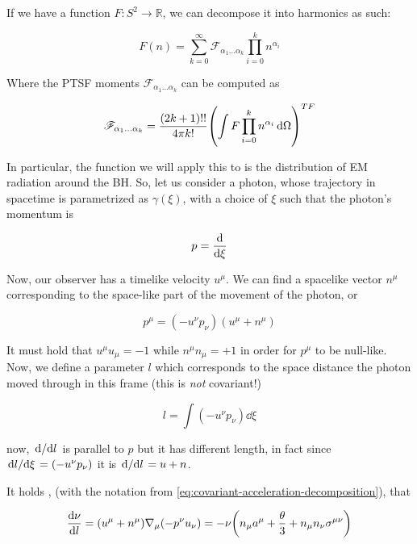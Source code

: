 \documentclass[main.tex]{subfiles}
\begin{document}
If we have a function \(F\colon S^2 \rightarrow \mathbb R\), we can decompose it into harmonics as such:

\begin{equation}
    F(n) = \sum _{k=0}   ^{\infty}
    \mathscr F_{\alpha_1 \dots \alpha_k} \prod_{i=0}^k n^{\alpha_i}
\end{equation}

Where the PTSF moments \(\mathscr F_{\alpha_1 \dots \alpha_k}\) can be computed as

\begin{equation} \label{eq:PSTF-moments-function-decomposition}
    \mathscr F_{\alpha_1 \dots \alpha_k} =
    \frac{(2k+1)!!}{4 \pi k!} \qty(\int F \prod_{i=0}^k n^{\alpha_i}  \dd{\Omega}  )^{TF}
\end{equation}

In particular, the function we will apply this to is the distribution of EM radiation around the BH. So, let us consider a photon, whose trajectory in spacetime is parametrized as \(\gamma(\xi)\), with a choice of \(\xi\) such that the photon's momentum is

\begin{equation}
    p = \dv{}{\xi}
\end{equation}

Now, our observer has a timelike velocity \(u^\mu\). We can find a spacelike vector \(n^\mu\) corresponding to the space-like part of the movement of the photon, or

\begin{equation}
    p^\mu = (- u^\nu p_\nu) (u^\mu + n^\mu)
\end{equation}

It must hold that \(u^\mu u_\mu = -1 \) while \(n^\mu n_\mu = +1 \) in order for \(p^\mu\) to be null-like.
Now, we define a parameter \(l\) which corresponds to the space distance the photon moved through in this frame (this is \emph{not} covariant!)

\begin{equation}
    l = \int  (-u^\nu p_\nu) \dd{\xi}
\end{equation}

now, \(\dv*{}{l} \) is parallel to \(p\) but it has different length, in fact since \(\dv*{l}{\xi} = (-u^\nu p_\nu) \) it is \(\dv*{}{l} = u + n \).

It holds \cite[eq. 2.17]{Thorne:1981feb}, (with the notation from \eqref{eq:covariant-acceleration-decomposition}),  that

\begin{equation}
  \dv{\nu}{l}  = (u^\mu + n^\mu) \nabla_\mu (-p^\nu u_\nu) = - \nu \qty(n_\mu a^\mu  + \frac{\theta}{3} + n_\mu n_\nu \sigma^{\mu\nu})
\end{equation}
\end{document}
